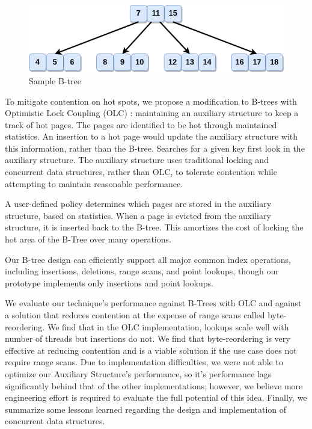 \documentclass[twocolumn]{article}
\begin{document}
\begin{figure}[ht]
\includegraphics[width=\columnwidth]{figures/btree_contention_example.png}
\caption{Sample B-tree\label{ex}}
\end{figure}

To mitigate contention on hot spots, we propose a modification to B-trees with
Optimistic Lock Coupling (OLC) \cite{art}: maintaining an auxiliary structure to keep
a track of hot pages. The pages are identified to be hot through maintained
statistics. An insertion to a hot page would update the auxiliary structure
with this information, rather than the B-tree. Searches for a given key first
look in the auxiliary structure. The auxiliary structure uses traditional
locking and concurrent data structures, rather than OLC, to tolerate contention
while attempting to maintain reasonable performance.

A user-defined policy determines which pages are stored in the auxiliary
structure, based on statistics. When a page is evicted from the auxiliary
structure, it is inserted back to the B-tree. This amortizes the cost of
locking the hot area of the B-Tree over many operations.

Our B-tree design can efficiently support all major common index operations,
including insertions, deletions, range scans, and point lookups, though our
prototype implements only insertions and point lookups.

We evaluate our technique’s performance against B-Trees with OLC and against a
solution that reduces contention at the expense of range scans called
byte-reordering. We find that in the OLC implementation, lookups scale well
with number of threads but insertions do not. We find that byte-reordering is
very effective at reducing contention and is a viable solution if the use case
does not require range scans. Due to implementation difficulties, we were not
able to optimize our Auxiliary Structure’s performance, so it’s performance
lags significantly behind that of the other implementations; however, we
believe more engineering effort is required to evaluate the full potential of
this idea. Finally, we summarize some lessons learned regarding the design and
implementation of concurrent data structures.
\end{document}
